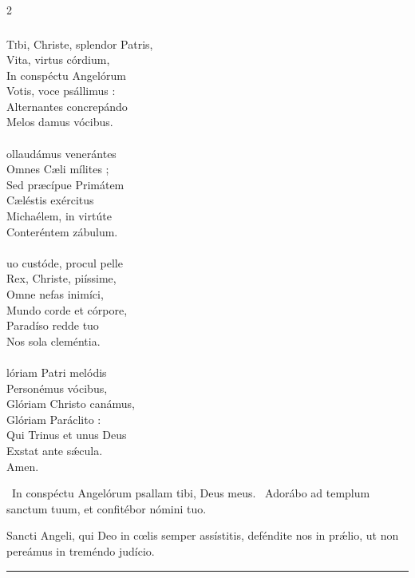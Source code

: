 \documentclass[9pt,twoside]{extarticle}
\begin{document}
\begin{multicols}{2}
{{\subsubsection*{\center {}}
\lettrine{T}ibi, Christe, splendor Patris,\\
Vita, virtus córdium,\\
In conspéctu Angelórum\\
Votis, voce psállimus :\\
Alternantes concrepándo\\
Melos damus vócibus.\\
\\
ollaudámus venerántes\\
Omnes Cæli mílites ;\\
Sed præcípue Primátem\\
Cæléstis exércitus\\
Michaélem, in virtúte\\
Conteréntem zábulum.\\
\\
uo custóde, procul pelle\\
Rex, Christe, piíssime,\\
Omne nefas inimíci,\\
Mundo corde et córpore,\\
Paradíso redde tuo\\
Nos sola cleméntia.\\
\\
lóriam Patri melódis\\
Personémus vócibus,\\
Glóriam Christo canámus,\\
Glóriam Paráclito :\\
Qui Trinus et unus Deus\\
Exstat ante sǽcula.\\
Amen.

\begin{tightlist}{}
\item {}~In conspéctu Angelórum psallam tibi, Deus meus. ~Adorábo ad templum sanctum tuum, et confitébor nómini tuo.
\item {} Sancti Angeli, qui Deo in cœlis semper assístitis, deféndite nos in prǽlio, ut non pereámus in treméndo judício.
\end{tightlist}

\begin{center}\textcolor{red}{\rule{\linewidth}{0.5pt}} \end{center}

}}
\end{multicols}
\end{document}
